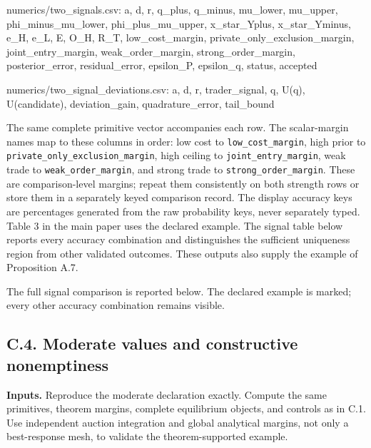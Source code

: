 \documentclass[
  11pt,
]{article}
\newenvironment{Shaded}{}{}
\newcommand{\NormalTok}[1]{#1}
\newcounter{none} %
\begin{document}
\begin{Shaded}
\begin{Highlighting}[]
\NormalTok{numerics/two\_signals.csv:}
\NormalTok{a, d, r, q\_plus, q\_minus, mu\_lower, mu\_upper,}
\NormalTok{phi\_minus\_mu\_lower, phi\_plus\_mu\_upper,}
\NormalTok{x\_star\_Yplus, x\_star\_Yminus, e\_H, e\_L, E, O\_H, R\_T,}
\NormalTok{low\_cost\_margin, private\_only\_exclusion\_margin, joint\_entry\_margin,}
\NormalTok{weak\_order\_margin, strong\_order\_margin,}
\NormalTok{posterior\_error, residual\_error, epsilon\_P, epsilon\_q,}
\NormalTok{status, accepted}

\NormalTok{numerics/two\_signal\_deviations.csv:}
\NormalTok{a, d, r, trader\_signal, q, U(q), U(candidate),}
\NormalTok{deviation\_gain, quadrature\_error, tail\_bound}
\end{Highlighting}
\end{Shaded}

The same complete primitive vector accompanies each row. The
scalar-margin names map to these columns in order: low cost to
\texttt{low\_cost\_margin}, high prior to
\texttt{private\_only\_exclusion\_margin}, high ceiling to
\texttt{joint\_entry\_margin}, weak trade to
\texttt{weak\_order\_margin}, and strong trade to
\texttt{strong\_order\_margin}. These are comparison-level margins;
repeat them consistently on both strength rows or store them in a
separately keyed comparison record. The display accuracy keys are
percentages generated from the raw probability keys, never separately
typed. Table 3 in the main paper uses the declared example. The signal
table below reports every accuracy combination and distinguishes the
sufficient uniqueness region from other validated outcomes. These
outputs also supply the example of Proposition A.7.

The full signal comparison is reported below. The declared example is
marked; every other accuracy combination remains visible.



\subsection{C.4. Moderate values and constructive
nonemptiness}\label{oa-c-moderate}

\textbf{Inputs.} Reproduce the moderate declaration exactly. Compute the
same primitives, theorem margins, complete equilibrium objects, and
controls as in C.1. Use independent auction integration and global
analytical margins, not only a best-response mesh, to validate the
theorem-supported example.
\end{document}
